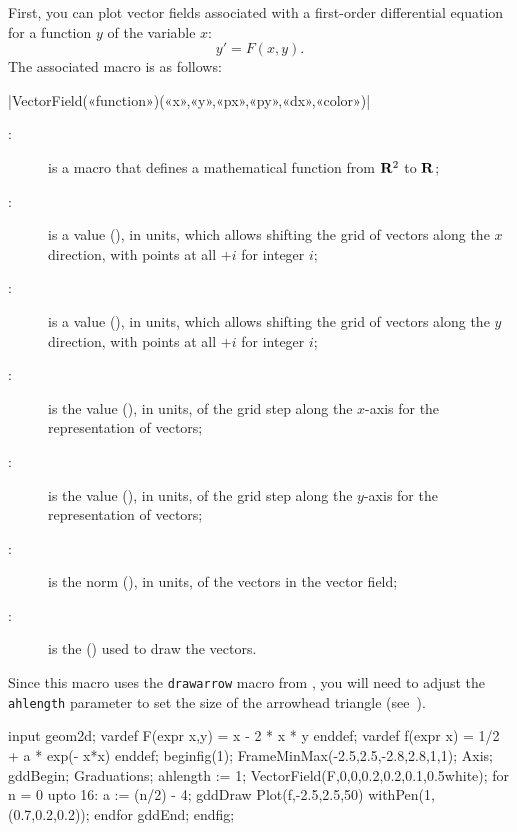 \documentclass[a4paper,english]{article}
\begin{document}
First, you can plot vector fields associated with a first-order differential equation for a function $y$ of the variable $x$:
\[y'=F(x,y).\]
The associated macro is as follows:
\begin{colourband}
  \macro|VectorField(«function»)(«x»,«y»,«px»,«py»,«dx»,«color»)|
  \begin{description}
    \item[:] is a \MP{} macro that defines a mathematical function from $\mathbf{R}^2$ to $\mathbf{R}$;
    \item[:] is a value (), in  units, which allows shifting the grid of vectors along the $x$ direction, with points at all $+i$ for integer $i$;
    \item[:] is a value (), in  units, which allows shifting the grid of vectors along the $y$ direction, with points at all $+i$ for integer $i$;
    \item[:] is the value (), in  units, of the grid step along the $x$-axis for the representation of vectors;
    \item[:] is the value (), in  units, of the grid step along the $y$-axis for the representation of vectors;
    \item[:] is the norm (), in  units, of the vectors in the vector field;
    \item[:] is the () used to draw the vectors.
  \end{description}
\end{colourband}

Since this macro uses the \lstinline+drawarrow+ macro from \MP{}, you will need to adjust the \lstinline+ahlength+ parameter to set the size of the arrowhead triangle (see~\cite{ctan-metapost}).
\begin{ExempleMP}
input geom2d;
vardef F(expr x,y) = x - 2 * x * y enddef;
vardef f(expr x) = 1/2 + a * exp(- x*x) enddef;
beginfig(1);
FrameMinMax(-2.5,2.5,-2.8,2.8,1,1);
Axis;
gddBegin;
Graduations;
ahlength := 1;
VectorField(F,0,0,0.2,0.2,0.1,0.5white);
for n = 0 upto 16:
  a := (n/2) - 4;
  gddDraw Plot(f,-2.5,2.5,50)
  withPen(1,(0.7,0.2,0.2));
endfor
gddEnd;
endfig;
\end{ExempleMP}
\end{document}
